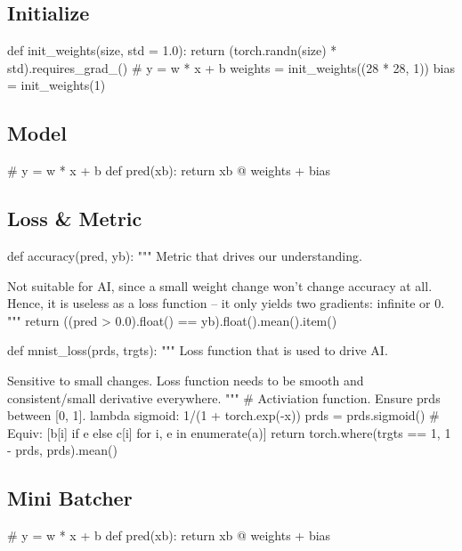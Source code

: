 \documentclass{article}
\newenvironment{monos}{\VerbatimEnvironment\begin{pythoncode}}{\end{pythoncode}}
\begin{document}
\subsection{Initialize}

\begin{monos}
def init_weights(size, std = 1.0):
    return (torch.randn(size) * std).requires_grad_()
# y = w * x + b
weights = init_weights((28 * 28, 1))
bias = init_weights(1)
\end{monos}

\subsection{Model}

\begin{monos}
# y = w * x + b
def pred(xb):
    return xb @ weights + bias
\end{monos}

\subsection{Loss \& Metric}

\begin{monos}
def accuracy(pred, yb):
    """
    Metric that drives our understanding. 
    
    Not suitable for AI, since a small weight change won't change accuracy at all. 
    Hence, it is useless as a loss function -- it only yields two gradients: infinite or 0.
    """
    return ((pred > 0.0).float() == yb).float().mean().item()


def mnist_loss(prds, trgts):
    """
    Loss function that is used to drive AI.

    Sensitive to small changes. 
    Loss function needs to be smooth and consistent/small derivative everywhere.
    """
    # Activiation function. Ensure prds between [0, 1]. lambda sigmoid: 1/(1 + torch.exp(-x))
    prds = prds.sigmoid()
    # Equiv: [b[i] if e else c[i] for i, e in enumerate(a)]
    return torch.where(trgts == 1, 1 - prds, prds).mean()
\end{monos}

\subsection{Mini Batcher}

\begin{monos}
# y = w * x + b
def pred(xb):
    return xb @ weights + bias
\end{monos}
\end{document}
